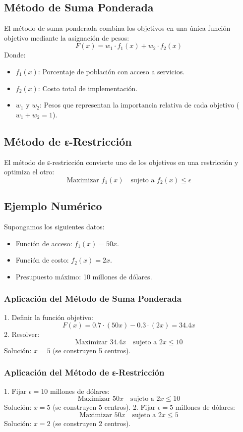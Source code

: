 \documentclass[12pt]{article}
\begin{document}
\subsection*{Método de Suma Ponderada}
El método de suma ponderada combina los objetivos en una única función objetivo mediante la asignación de pesos:
\[
F(x) = w_1 \cdot f_1(x) + w_2 \cdot f_2(x)
\]
Donde:
\begin{itemize}
	\item \( f_1(x) \): Porcentaje de población con acceso a servicios.
	\item \( f_2(x) \): Costo total de implementación.
	\item \( w_1 \) y \( w_2 \): Pesos que representan la importancia relativa de cada objetivo (\( w_1 + w_2 = 1 \)).
\end{itemize}

\subsection*{Método de ε-Restricción}
El método de ε-restricción convierte uno de los objetivos en una restricción y optimiza el otro:
\[
\text{Maximizar } f_1(x) \quad \text{sujeto a } f_2(x) \leq \epsilon
\]

\subsection*{Ejemplo Numérico}
Supongamos los siguientes datos:
\begin{itemize}
	\item Función de acceso: \( f_1(x) = 50x \).
	\item Función de costo: \( f_2(x) = 2x \).
	\item Presupuesto máximo: 10 millones de dólares.
\end{itemize}

\subsubsection*{Aplicación del Método de Suma Ponderada}
1. Definir la función objetivo:
\[
F(x) = 0.7 \cdot (50x) - 0.3 \cdot (2x) = 34.4x
\]
2. Resolver:
\[
\text{Maximizar } 34.4x \quad \text{sujeto a } 2x \leq 10
\]
Solución: \( x = 5 \) (se construyen 5 centros).

\subsubsection*{Aplicación del Método de ε-Restricción}
1. Fijar \( \epsilon = 10 \) millones de dólares:
\[
\text{Maximizar } 50x \quad \text{sujeto a } 2x \leq 10
\]
Solución: \( x = 5 \) (se construyen 5 centros).
2. Fijar \( \epsilon = 5 \) millones de dólares:
\[
\text{Maximizar } 50x \quad \text{sujeto a } 2x \leq 5
\]
Solución: \( x = 2 \) (se construyen 2 centros).
\end{document}
